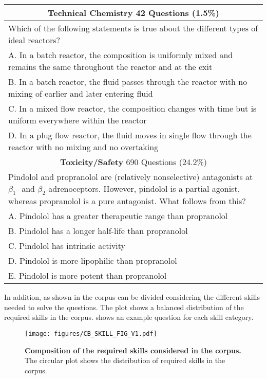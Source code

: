 \begin{table}
{\begin{tabularx}{\textwidth}{X}
            \midrule
            \multicolumn{1}{c}{\textbf{Technical Chemistry} 42 Questions (1.5\%)} \\
            \midrule
            Which of the following statements is true about the different types of ideal reactors? \\
            A. In a batch reactor, the composition is uniformly mixed and remains the same throughout the reactor and at the exit \\
            B. In a batch reactor, the fluid passes through the reactor with no mixing of earlier and later entering fluid \\
            C. In a mixed flow reactor, the composition changes with time but is uniform everywhere within the reactor \\
            D. In a plug flow reactor, the fluid moves in single flow through the reactor with no mixing and no overtaking \\
            \midrule
            \multicolumn{1}{c}{\textbf{Toxicity/Safety} 690 Questions (24.2\%)} \\
            \midrule
            Pindolol and propranolol are (relatively nonselective) antagonists at $\beta_1$- and $\beta_2$-adrenoceptors. However, pindolol is a partial agonist, whereas propranolol is a pure antagonist. What follows from this? \\
            A. Pindolol has a greater therapeutic range than propranolol \\
            B. Pindolol has a longer half-life than propranolol \\
            C. Pindolol has intrinsic activity \\
            D. Pindolol is more lipophilic than propranolol \\
            E. Pindolol is more potent than propranolol \\
            \bottomrule
        \end{tabularx}
    }
\end{table}

\normalsize


In addition, as shown in  the \chembench corpus can be divided considering the different skills needed to solve the questions. The plot shows a balanced distribution of the required skills in the \chembench corpus.  shows an example question for each skill category.

\begin{figure}
    \centering
    \texttt{[image: figures/CB\_SKILL\_FIG\_V1.pdf]}
    \caption{\textbf{Composition of the required skills considered in the \chembench corpus.} The circular plot shows the distribution of required skills in the \chembench corpus.}
    \label{fig:cb_skillset}
\end{figure}


